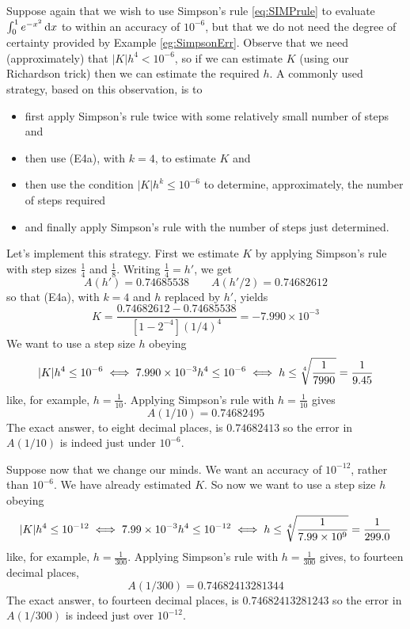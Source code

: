 \begin{eg}\label{eg:SimpsonErrB}
Suppose again that  we wish to use Simpson's rule \eqref{eq:SIMPrule} to evaluate
$\int_0^1 e^{-x^2}\,\mathrm{d}x$ to within an accuracy of $10^{-6}$, but that we
do not need the degree of certainty provided by Example \ref{eg:SimpsonErr}. Observe that we need (approximately) that $|K|h^4 < 10^{-6}$, so if we can
estimate $K$ (using our Richardson trick) then we can estimate the required $h$.
A commonly used strategy, based on this observation, is to
\begin{itemize}
\item first apply Simpson's rule twice with some relatively small number
of steps and
\item then use (E4a), with $k=4$, to estimate $K$ and
\item then use the condition $|K| h^k\le 10^{-6}$ to determine, approximately,
the number of steps required
\item and finally apply Simpson's rule with the number of steps just determined.
\end{itemize}
Let's implement this strategy. First we estimate $K$ by applying Simpson's 
rule with step sizes $\tfrac{1}{4}$ and $\tfrac{1}{8}$. Writing 
$\tfrac{1}{4}=h'$, we get
\begin{equation*}
A(h')=0.74685538  %
\qquad
A(h'/2)=0.74682612 %
\end{equation*}
so that (E4a), with $k=4$ and $h$ replaced
by $h'$, yields
\begin{equation*}
K=\frac{0.74682612 - 0.74685538}{[1-2^{-4}](1/4)^4}
=-7.990\times 10^{-3}
\end{equation*}
We want to use a step size $h$ obeying
\begin{equation*}
|K|h^4\le 10^{-6}
\iff 7.990\times 10^{-3} h^4\le 10^{-6}
\iff h \le\root{4}\of{\frac{1}{7990}} =\frac{1}{9.45}
\end{equation*}
like, for example, $h=\tfrac{1}{10}$. Applying Simpson's rule with
$h=\tfrac{1}{10}$ gives
\begin{equation*}
A(1/10) = 0.74682495
\end{equation*}
The exact answer, to eight decimal places, is $0.74682413$ so the error
in $A(1/10)$ is indeed just under $10^{-6}$.

Suppose now that we change our minds. We want an accuracy of $10^{-12}$, rather than $10^{-6}$. We have already estimated $K$. So now we want to use a 
step size $h$ obeying
\begin{equation*}
|K|h^4\le 10^{-12}
\iff 7.99\times 10^{-3} h^4\le 10^{-12}
\iff h \le\root{4}\of{\frac{1}{7.99\times 10^9}} =\frac{1}{299.0}
\end{equation*}
like, for example, $h=\tfrac{1}{300}$. Applying Simpson's rule with
$h=\tfrac{1}{300}$ gives, to fourteen decimal places,
\begin{equation*}
A(1/300) = 0.74682413281344
\end{equation*}
The exact answer, to fourteen decimal places, is $0.74682413281243$ so the error
in $A(1/300)$ is indeed just over $10^{-12}$.
\end{eg}


